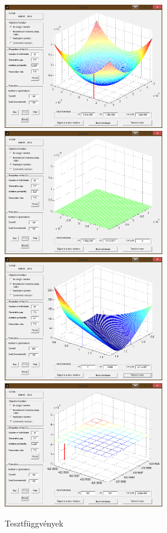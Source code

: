 \begin{figure}[!h]
	\centering
	\includegraphics[width=71mm, keepaspectratio]{figures/m02/dejong.png}\hspace{5mm}
	\includegraphics[width=71mm, keepaspectratio]{figures/m02/rastr.png}\vspace{5mm}
	\includegraphics[width=71mm, keepaspectratio]{figures/m02/rosenbr.png}\hspace{5mm}
	\includegraphics[width=71mm, keepaspectratio]{figures/m02/schwfl.png}
	\caption{Tesztfüggvények} 
	\label{fig:Dejong}
\end{figure}

